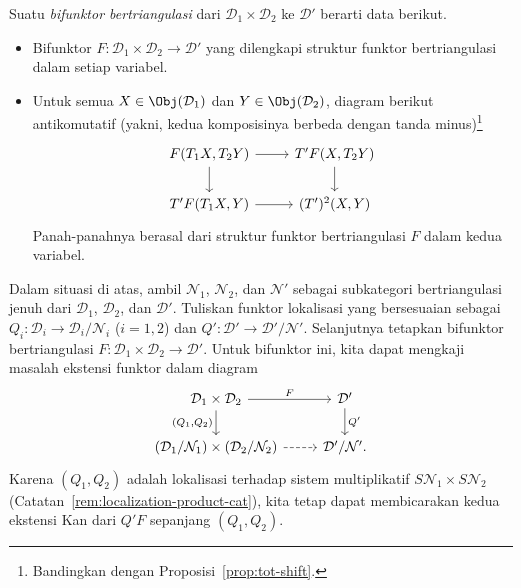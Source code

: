 \begin{definisi}\label{def:triangulated-bifunctor}
	Suatu \emph{bifunktor bertriangulasi} dari
	$\mathcal{D}_1\times\mathcal{D}_2$ ke $\mathcal{D}'$ berarti data berikut.
	\begin{itemize}
		\item Bifunktor $F:\mathcal{D}_1\times\mathcal{D}_2\to\mathcal{D}'$
		yang dilengkapi struktur funktor bertriangulasi dalam setiap variabel.
		\item Untuk semua $X\in\Obj(\mathcal{D}_1)$ dan
		$Y\in\Obj(\mathcal{D}_2)$, diagram berikut antikomutatif (yakni, kedua
		komposisinya berbeda dengan tanda minus)\footnote{Bandingkan dengan
		Proposisi~\ref{prop:tot-shift}.}
		\[\begin{tikzcd}
			F(T_1 X, T_2 Y) \arrow[r] \arrow[d] & T' F(X, T_2 Y) \arrow[d] \\
			T' F(T_1 X, Y) \arrow[r] & (T')^2(X, Y)
		\end{tikzcd}\]
		Panah-panahnya berasal dari struktur funktor bertriangulasi $F$ dalam
		kedua variabel.
	\end{itemize}
\end{definisi}

Dalam situasi di atas, ambil $\mathcal{N}_1$, $\mathcal{N}_2$, dan
$\mathcal{N}'$ sebagai subkategori bertriangulasi jenuh dari
$\mathcal{D}_1$, $\mathcal{D}_2$, dan $\mathcal{D}'$. Tuliskan funktor
lokalisasi yang bersesuaian sebagai
$Q_i:\mathcal{D}_i\to\mathcal{D}_i/\mathcal{N}_i$ ($i=1,2$) dan
$Q':\mathcal{D}'\to\mathcal{D}'/\mathcal{N}'$. Selanjutnya tetapkan bifunktor
bertriangulasi $F:\mathcal{D}_1\times\mathcal{D}_2\to\mathcal{D}'$.
Untuk bifunktor ini, kita dapat mengkaji masalah ekstensi funktor dalam diagram
\[\begin{tikzcd}
	\mathcal{D}_1 \times \mathcal{D}_2 \arrow[d, "{(Q_1, Q_2)}"'] \arrow[r, "F"] & \mathcal{D}' \arrow[d, "{Q'}"] \\
	(\mathcal{D}_1 / \mathcal{N}_1) \times (\mathcal{D}_2 / \mathcal{N}_2) \arrow[r, dashed] & \mathcal{D}'/\mathcal{N}' .
\end{tikzcd}\]
Karena $(Q_1,Q_2)$ adalah lokalisasi terhadap sistem multiplikatif
$S\mathcal{N}_1\times S\mathcal{N}_2$
(Catatan~\ref{rem:localization-product-cat}), kita tetap dapat membicarakan
kedua ekstensi Kan dari $Q'F$ sepanjang $(Q_1,Q_2)$.

